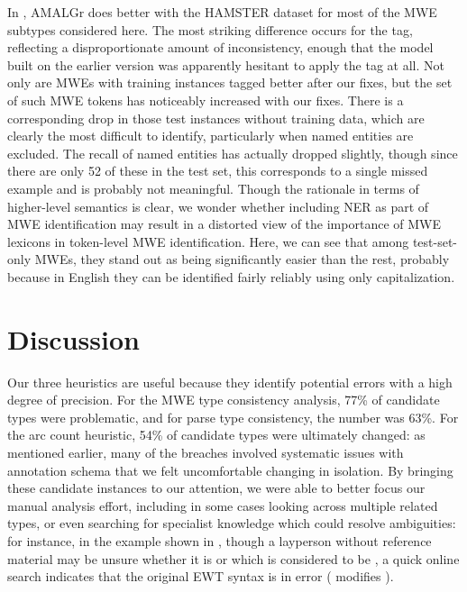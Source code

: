 \documentclass[output=paper
,modfonts
,nonflat]{langsci/langscibook}
\begin{document}
In , AMALGr does better with the HAMSTER dataset for most of the MWE subtypes considered here. The most striking difference occurs for the \weak tag, reflecting a disproportionate amount of inconsistency, enough that the model built on the earlier version was apparently hesitant to apply the tag at all. Not only are MWEs with training instances tagged better after our fixes, but the set of such MWE tokens has noticeably increased with our fixes. There is a corresponding drop in those test instances without training data, which are clearly the most difficult to identify, particularly when named entities are excluded. The recall of named entities has actually dropped slightly, though since there are only 52 of these in the test set, this corresponds to a single missed example and is probably not meaningful. Though the rationale in terms of higher-level semantics is clear, we wonder whether including NER as part of MWE identification may result in a distorted view of the importance of MWE lexicons in token-level MWE identification. Here, we can see that among test-set-only MWEs, they stand out as being significantly easier than the rest, probably because in English they can be identified fairly reliably using only capitalization.

\section{Discussion}

Our three heuristics are useful because they identify potential errors with a high degree of precision. For the MWE type consistency analysis, 77\% of candidate types were problematic, and for parse type consistency, the number was 63\%. For the arc count heuristic, 54\% of candidate types were ultimately changed: as mentioned earlier, many of the breaches involved systematic issues with annotation schema that we felt uncomfortable changing in isolation. By bringing these candidate instances to our attention, we were able to better focus our manual analysis effort, including in some cases looking across multiple related types, or even searching for specialist knowledge which could resolve ambiguities: for instance, in the example shown in , though a layperson without reference material may be unsure whether it is  or  which is considered to be , a quick online search indicates that the original EWT syntax is in error ( modifies ).
\end{document}
